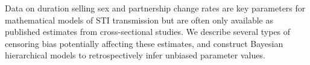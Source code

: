 Data on duration selling sex and partnership change rates
are key parameters for mathematical models of STI transmission
but are often only available as published estimates from cross-sectional studies.
We describe several types of censoring bias potentially affecting these estimates,
and construct Bayesian hierarchical models to
retrospectively infer unbiased parameter values.
